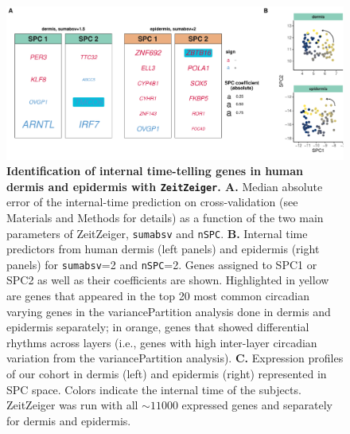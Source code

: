 \begin{figure}[t!]
	\begin{center}
		\includegraphics[width=\textwidth]{./Figures/fig3.pdf}
		\caption{\textbf{Identification of internal time-telling genes in human dermis and epidermis with \texttt{ZeitZeiger}. A. }Median absolute error of the internal-time prediction on cross-validation (see Materials and Methods for details) as a function of the two main parameters of ZeitZeiger, \texttt{sumabsv} and \texttt{nSPC}. \textbf{B. }Internal time predictors from human dermis (left panels) and epidermis (right panels) for \texttt{sumabsv}=2 and \texttt{nSPC}=2. Genes assigned to SPC1 or SPC2 as well as their coefficients are shown. Highlighted in yellow are genes that appeared in the top 20 most common circadian varying genes in the variancePartition analysis done in dermis and epidermis separately; in orange, genes that showed differential rhythms across layers (i.e., genes with high inter-layer circadian variation from the variancePartition analysis). \textbf{C. }Expression profiles of our cohort in dermis (left) and epidermis (right) represented in SPC space. Colors indicate the internal time of the subjects. ZeitZeiger was run with all $\sim11000$ expressed genes and separately for dermis and epidermis.}
		\label{fig:fig3}
	\end{center}
\end{figure}


